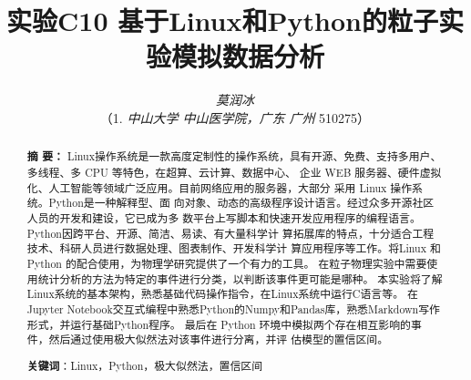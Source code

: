\documentclass[10pt,a4paper,twoside,UTF8]{ctexart}
\begin{document}
\title{\LARGE\textbf{实验C10 基于Linux和Python的粒子实验模拟数据分析}\footnotemark[1]}
\author{\large\textit{莫润冰\footnotemark[2]}
\\ \normalsize{（1. \textit{中山大学 中山医学院，广东 广州 }510275）}}
\date{}%


	\maketitle  %
  	\renewcommand{\abstractname} {} %
	\begin{abstract}
	\vspace{-3em}
	{\bf 摘{} 要：}
	{\small 
	Linux操作系统是一款高度定制性的操作系统，具有开源、免费、支持多用户、多线程、多 CPU 等特色，在超算、云计算、数据中心、
	企业 WEB 服务器、硬件虚拟化、人工智能等领域广泛应用。目前网络应用的服务器，大部分
	采用 Linux 操作系统。Python是一种解释型、面
	向对象、动态的高级程序设计语言。经过众多开源社区人员的开发和建设，它已成为多
	数平台上写脚本和快速开发应用程序的编程语言。Python因跨平台、开源、简洁、易读、有大量科学计
	算拓展库的特点，十分适合工程技术、科研人员进行数据处理、图表制作、开发科学计
	算应用程序等工作。将Linux 和 Python 的配合使用，为物理学研究提供了一个有力的工具。
    在粒子物理实验中需要使用统计分析的方法为特定的事件进行分类，以判断该事件更可能是哪种。
	本实验将了解Linux系统的基本架构，熟悉基础代码操作指令，在Linux系统中运行C语言等。
	在Jupyter Notebook交互式编程中熟悉Python的Numpy和Pandas库，熟悉Markdown写作形式，并运行基础Python程序。
	最后在 Python 环境中模拟两个存在相互影响的事件，然后通过使用极大似然法对该事件进行分离，并评
	估模型的置信区间。
	}
	\par%
	\textbf{关键词}：Linux，Python，极大似然法，置信区间
	\vspace{2em}
	\end{abstract}
\end{document}
